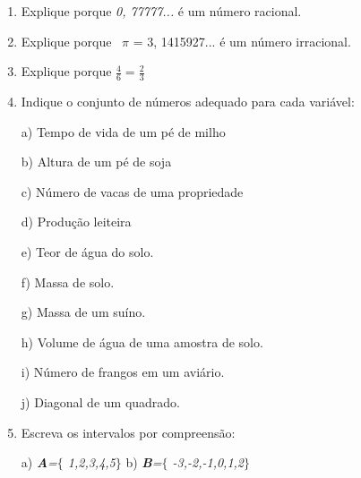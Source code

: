 \documentclass[12pt]{article}
\renewcommand{\_}{\kern-1.5pt\textunderscore\kern-1.5pt}
\begin{document}
\vspace{\baselineskip}
\begin{enumerate}[label*={\fontsize{12pt}{12pt}\selectfont \arabic*.}]
	\item  Explique porque \textit{0, 77777...} é um número racional.\par


\vspace{\baselineskip}
	\item  Explique porque \  $ \pi $  = 3, 1415927... é um número irracional.\par


\vspace{\baselineskip}
	\item  Explique porque  \( \frac{4}{6}=\frac{2}{3} \)  \ \  \par


\vspace{\baselineskip}
\setlength{\parskip}{8.04pt}
\setlength{\parskip}{6.0pt}
	\item  Indique o conjunto de números adequado para cada variável:\par

\tab a) Tempo de vida de um pé de milho\par

\tab b) Altura de um pé de soja\par

\tab c) Número de vacas de uma propriedade\par

\tab d) Produção leiteira\par

\tab e) Teor de água do solo.\par

\tab f) Massa de solo.\par

\tab g) Massa de um suíno.\par

\tab h) Volume de água de uma amostra de solo.\par

\tab i) Número de frangos em um aviário.\par

\tab j) Diagonal de um quadrado.\par

	\item  Escreva os intervalos por compreensão:\par

\tab a) \textbf{\textit{A}}\textit{=$ \{ $ 1,2,3,4,5$ \} $ } \tab \tab \tab \tab \tab b) \textbf{\textit{B}}\textit{=$ \{ $ -3,-2,-1,0,1,2$ \} $ }\par


\end{enumerate}
\end{document}
